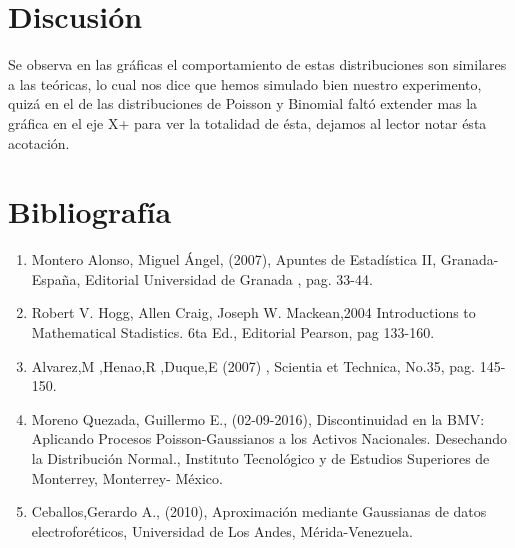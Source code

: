\documentclass[12pt,a4paper]{article}
\begin{document}
\begin{multicols}{2}
\section{Discusión}
    Se observa en las gráficas el comportamiento de estas distribuciones son similares a las teóricas, lo cual nos dice que hemos simulado bien nuestro experimento, quizá en el de las distribuciones de Poisson y Binomial faltó extender mas la gráfica en el eje X+ para ver la totalidad de ésta, dejamos al lector notar ésta acotación. 
\section{Bibliografía}
\begin{enumerate}
    \item Montero Alonso, Miguel Ángel, (2007), Apuntes de Estadística II, Granada-España, Editorial Universidad de Granada , pag. 33-44.
    \item Robert V. Hogg, Allen Craig, Joseph W. Mackean,2004 Introductions to Mathematical Stadistics. 6ta Ed., Editorial Pearson, pag 133-160. 
    \item Alvarez,M ,Henao,R ,Duque,E (2007) , Scientia et Technica, No.35, pag. 145-150.
    \item Moreno Quezada, Guillermo E., (02-09-2016), Discontinuidad en la BMV: Aplicando Procesos Poisson-Gaussianos a los Activos Nacionales. Desechando la Distribución Normal., Instituto Tecnológico y de Estudios Superiores de Monterrey, Monterrey- México.
    \item Ceballos,Gerardo A., (2010), Aproximación mediante Gaussianas de datos electroforéticos, Universidad de Los Andes, Mérida-Venezuela.
\end{enumerate}
\end{multicols}
\end{document}
